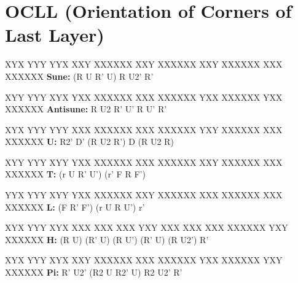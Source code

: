 \section{OCLL (Orientation of Corners of Last Layer)}

\begin{multicols}{2}

\RubikCubeGreyAll
\RubikFaceUp XYX YYY YYX
\RubikFaceFront XXY XXXXXX
\RubikFaceRight XXY XXXXXX
\RubikFaceBack XXY XXXXXX
\RubikFaceLeft XXX XXXXXX
	\noindent{}
\hspace{0.45cm}\textbf{Sune:} (R U R' U) R U2' R'
\vspace{0.2cm}

\RubikCubeGreyAll
\RubikFaceUp XYY YYY XYX
\RubikFaceFront YXX XXXXXX
\RubikFaceRight XXX XXXXXX
\RubikFaceBack YXX XXXXXX
\RubikFaceLeft YXX XXXXXX
	\noindent{}
\hspace{0.45cm}\textbf{Antisune:} R U2 R' U' R U' R'
\vspace{0.2cm}

\RubikCubeGreyAll
\RubikFaceUp XYX YYY YYY
\RubikFaceFront XXX XXXXXX
\RubikFaceRight XXX XXXXXX
\RubikFaceBack YXY XXXXXX
\RubikFaceLeft XXX XXXXXX
	\noindent{}
\hspace{0.45cm}\textbf{U:} R2' D' (R U2 R') D (R U2 R)
\vspace{0.2cm}

\RubikCubeGreyAll
\RubikFaceUp XYY YYY XYY
\RubikFaceFront YXX XXXXXX
\RubikFaceRight XXX XXXXXX
\RubikFaceBack XXY XXXXXX
\RubikFaceLeft XXX XXXXXX
	\noindent{}
\hspace{0.45cm}\textbf{T:} (r U R' U') (r' F R F')
\vspace{0.2cm}

\RubikCubeGreyAll
\RubikFaceUp YYX YYY XYY
\RubikFaceFront YXX XXXXXX
\RubikFaceRight XXY XXXXXX
\RubikFaceBack XXX XXXXXX
\RubikFaceLeft XXX XXXXXX
	\noindent{}
\hspace{0.45cm}\textbf{L:} (F R' F') (r U R U') r'
\vspace{0.2cm}

\RubikCubeGreyAll
\RubikFaceUp XYX YYY XYX
\RubikFaceFront XXX XXX XXX
\RubikFaceRight YXY XXX XXX
\RubikFaceBack XXX XXXXXX
\RubikFaceLeft YXY XXXXXX
	\noindent{}
\hspace{0.45cm}\textbf{H:} (R U) (R' U) (R U') (R' U) (R U2') R'
\vspace{0.2cm}

\RubikCubeGreyAll
\RubikFaceUp XYX YYY XYX
\RubikFaceFront XXY XXXXXX
\RubikFaceRight XXX XXXXXX
\RubikFaceBack YXX XXXXXX
\RubikFaceLeft YXY XXXXXX
	\noindent{}
\hspace{0.2cm}\textbf{Pi:} R' U2' (R2 U R2' U) R2 U2' R'

\end{multicols}

